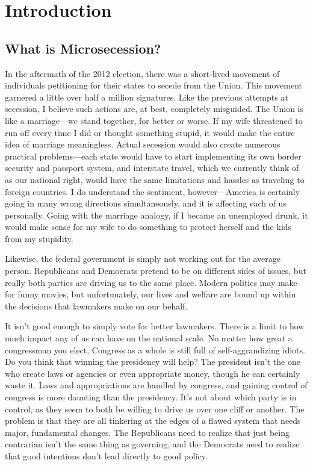 \chapter*{Introduction}

\section{What is Microsecession?}

In the aftermath of the 2012 election, there was a short-lived movement
of individuals petitioning for their states to secede from the
Union. This movement
garnered a little over half a million signatures. Like the previous
attempts at secession, I believe such actions are, at best, completely
misguided.   The Union is like a marriage---we stand together,
for better or worse.  If my wife threatened to run off
every time I did or thought something stupid, it would make the entire
idea of marriage meaningless.  Actual secession would also create
numerous practical problems---each state would have to start implementing
its own border security and passport system, and interstate travel, which
we currently think of as our national right, would have the same limitations
and hassles as traveling to foreign countries.  I do understand the
sentiment, however---America is certainly going in many wrong directions
simultaneously, and it is affecting each of us personally.  Going with 
the marriage analogy, if I became an unemployed drunk, it would make sense
for my wife to do something to protect herself and the kids from my stupidity.

Likewise, the federal government is simply not working out for the average person.
Republicans and Democrats pretend to be on different sides of issues,
but really both
parties are driving us to the same place. Modern politics
may make for funny
movies, but unfortunately, our lives and welfare are bound up within
the decisions that lawmakers make on our behalf.

It isn’t good enough to simply vote for better lawmakers. There is a
limit to how much impact any of us can have on the national scale. No
matter how great a congressman you elect, Congress as a whole is still
full of self-aggrandizing idiots. Do you think that winning the
presidency will help?  The president isn’t the one who create laws
or agencies or even appropriate money, though he can certainly waste it. 
Laws and appropriations are handled by congress, and gaining control
of congress is more daunting than the presidency.  It's not about which
party is in control, as they seem to both be willing to drive us over
one cliff or another.  The problem is that they are all tinkering at
the edges of a flawed system that needs major, fundamental changes.
The Republicans need to realize that just being contrarian isn't 
the same thing as governing, and the Democrats need to realize that 
good intentions don't lead directly to good policy.

